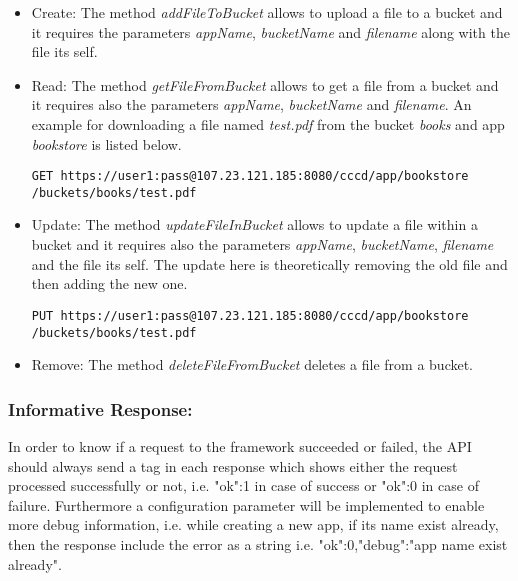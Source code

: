 \begin{itemize}
\item {Create:} The method \textit{addFileToBucket} allows to upload a file to a bucket and it requires the parameters \textit{appName}, \textit{bucketName} and \textit{filename} along with the file its self.

\item {Read:} The method \textit{getFileFromBucket} allows to get a file from a bucket and it requires also the parameters \textit{appName}, \textit{bucketName} and \textit{filename}.  An example for downloading a file named \textit{test.pdf} from the bucket \textit{books} and app \textit{bookstore} is listed below.

\begin{code}
\begin{verbatim}
GET https://user1:pass@107.23.121.185:8080/cccd/app/bookstore
/buckets/books/test.pdf
\end{verbatim}
\end{code}

\item {Update:} The method \textit{updateFileInBucket} allows to update a file within a bucket and it requires also the parameters \textit{appName}, \textit{bucketName}, \textit{filename} and the file its self.  The update here is theoretically removing the old file and then adding the new one.
\begin{code}
\begin{verbatim}
PUT https://user1:pass@107.23.121.185:8080/cccd/app/bookstore
/buckets/books/test.pdf
\end{verbatim}
\end{code}

\item {Remove:} The method \textit{deleteFileFromBucket} deletes a file from a bucket.

\end{itemize}





\subsubsection{Informative Response:} In order to know if a request to the framework succeeded or failed, the API should always send a tag in each response which shows either the request processed successfully or not, i.e. {"ok":1} in case of success or {"ok":0} in case of failure. Furthermore a configuration parameter will be implemented to enable more debug information, i.e. while creating a new app, if its name exist already, then the response include the error as a string i.e. {"ok":0,"debug":"app name exist already"}.

